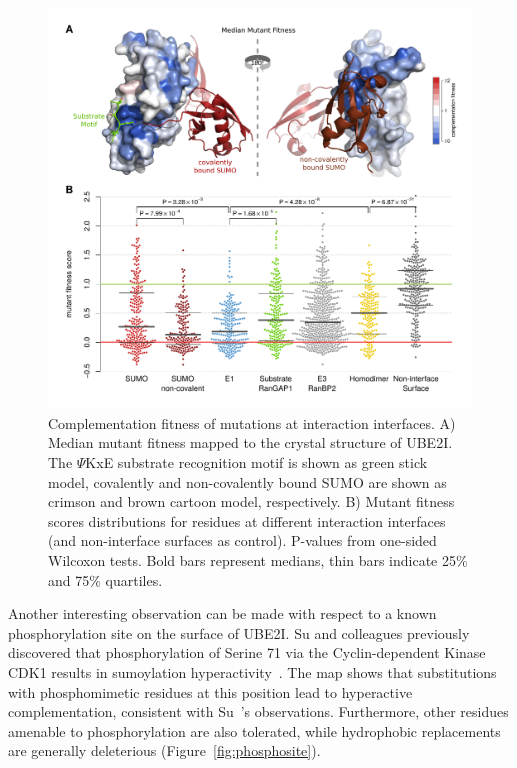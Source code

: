 \begin{figure}[h!]
	\centering
	\includegraphics[width=\textwidth]{img/ube2i_interfaces.pdf}
	\caption{Complementation fitness of mutations at interaction interfaces. A) Median mutant fitness mapped to the crystal structure of UBE2I. The $\Psi$KxE substrate recognition motif is shown as green stick model, covalently and non-covalently bound SUMO are shown as crimson and brown cartoon model, respectively. B) Mutant fitness scores distributions for residues at different interaction interfaces (and non-interface surfaces as control). P-values from one-sided Wilcoxon tests. Bold bars represent medians, thin bars indicate 25\% and 75\% quartiles.}
	\label{fig:ube2i_interfaces}
\end{figure}

Another interesting observation can be made with respect to a known phosphorylation site on the surface of UBE2I. Su and colleagues previously discovered that phosphorylation of Serine 71 via the Cyclin-dependent Kinase CDK1 results in sumoylation hyperactivity~\cite{su_phosphorylation_2012}. The map shows that substitutions with phosphomimetic residues at this position lead to hyperactive complementation, consistent with Su~\etal's observations. Furthermore, other residues amenable to phosphorylation are also tolerated, while hydrophobic replacements are generally deleterious (Figure~\ref{fig:phosphosite}).


